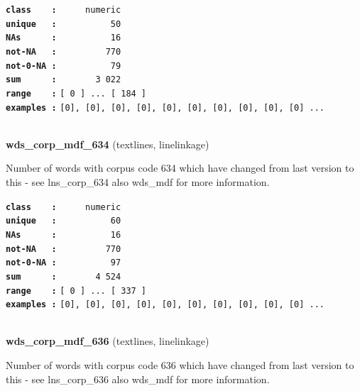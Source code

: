 \documentclass[]{article}
\begin{document}
\textbf{\texttt{class\ \ \ \ :}} \texttt{~~~~~numeric}\\
\textbf{\texttt{unique\ \ \ :}} \texttt{~~~~~~~~~~50}\\
\textbf{\texttt{NAs\ \ \ \ \ \ :}} \texttt{~~~~~~~~~~16}\\
\textbf{\texttt{not-NA\ \ \ :}} \texttt{~~~~~~~~~770}\\
\textbf{\texttt{not-0-NA\ :}} \texttt{~~~~~~~~~~79}\\
\textbf{\texttt{sum\ \ \ \ \ \ :}} \texttt{~~~~~~~3~022}\\
\textbf{\texttt{range\ \ \ \ :}}
\texttt{{[}\ 0\ {]}\ ...\ {[}\ 184\ {]}}\\
\textbf{\texttt{examples\ :}}
\texttt{{[}0{]},\ {[}0{]},\ {[}0{]},\ {[}0{]},\ {[}0{]},\ {[}0{]},\ {[}0{]},\ {[}0{]},\ {[}0{]},\ {[}0{]}\ ...}\\

~

\textbf{wds\_corp\_mdf\_634} (textlines, linelinkage)

Number of words with corpus code 634 which have changed from last
version to this - see lns\_corp\_634 also wds\_mdf for more information.

\textbf{\texttt{class\ \ \ \ :}} \texttt{~~~~~numeric}\\
\textbf{\texttt{unique\ \ \ :}} \texttt{~~~~~~~~~~60}\\
\textbf{\texttt{NAs\ \ \ \ \ \ :}} \texttt{~~~~~~~~~~16}\\
\textbf{\texttt{not-NA\ \ \ :}} \texttt{~~~~~~~~~770}\\
\textbf{\texttt{not-0-NA\ :}} \texttt{~~~~~~~~~~97}\\
\textbf{\texttt{sum\ \ \ \ \ \ :}} \texttt{~~~~~~~4~524}\\
\textbf{\texttt{range\ \ \ \ :}}
\texttt{{[}\ 0\ {]}\ ...\ {[}\ 337\ {]}}\\
\textbf{\texttt{examples\ :}}
\texttt{{[}0{]},\ {[}0{]},\ {[}0{]},\ {[}0{]},\ {[}0{]},\ {[}0{]},\ {[}0{]},\ {[}0{]},\ {[}0{]},\ {[}0{]}\ ...}\\

~

\textbf{wds\_corp\_mdf\_636} (textlines, linelinkage)

Number of words with corpus code 636 which have changed from last
version to this - see lns\_corp\_636 also wds\_mdf for more information.
\end{document}
